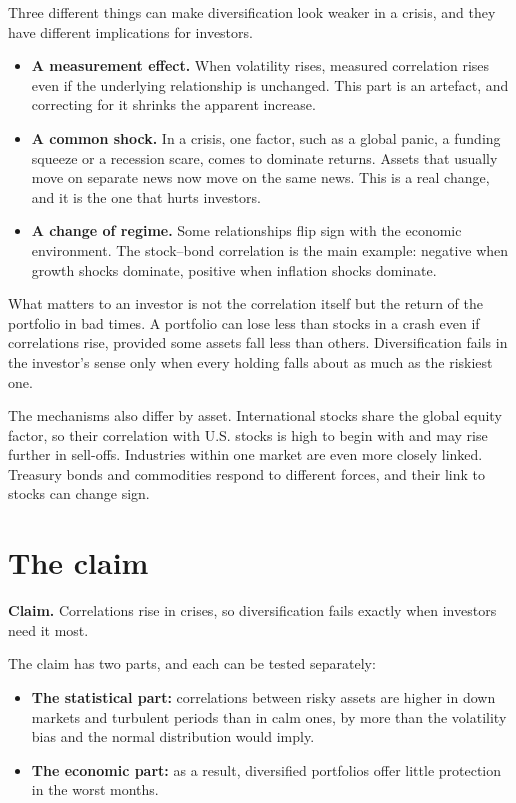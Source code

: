 Three different things can make diversification look weaker in a crisis, and they have different implications for investors.

\begin{itemize}
  \item \textbf{A measurement effect.} When volatility rises, measured correlation rises even if the underlying relationship is unchanged. This part is an artefact, and correcting for it shrinks the apparent increase.
  \item \textbf{A common shock.} In a crisis, one factor, such as a global panic, a funding squeeze or a recession scare, comes to dominate returns. Assets that usually move on separate news now move on the same news. This is a real change, and it is the one that hurts investors.
  \item \textbf{A change of regime.} Some relationships flip sign with the economic environment. The stock--bond correlation is the main example: negative when growth shocks dominate, positive when inflation shocks dominate.
\end{itemize}

What matters to an investor is not the correlation itself but the return of the portfolio in bad times. A portfolio can lose less than stocks in a crash even if correlations rise, provided some assets fall less than others. Diversification fails in the investor's sense only when every holding falls about as much as the riskiest one.

The mechanisms also differ by asset. International stocks share the global equity factor, so their correlation with U.S. stocks is high to begin with and may rise further in sell-offs. Industries within one market are even more closely linked. Treasury bonds and commodities respond to different forces, and their link to stocks can change sign.

\section{The claim}
\label{sec:13-claim}

\begin{callout}
\textbf{Claim.} Correlations rise in crises, so diversification fails exactly when investors need it most.
\end{callout}

The claim has two parts, and each can be tested separately:

\begin{itemize}
  \item \textbf{The statistical part:} correlations between risky assets are higher in down markets and turbulent periods than in calm ones, by more than the volatility bias and the normal distribution would imply.
  \item \textbf{The economic part:} as a result, diversified portfolios offer little protection in the worst months.
\end{itemize}

